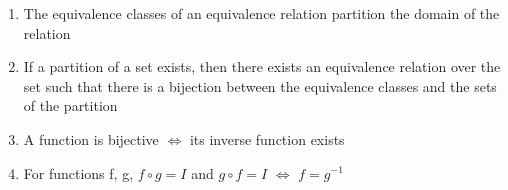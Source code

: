 \documentclass{article}
\begin{document}
\begin{enumerate}
\item The equivalence classes of an equivalence relation partition the domain of
the relation

\item If a partition of a set exists, then there exists an equivalence relation
over the set such that there is a bijection between the equivalence classes and
the sets of the partition

\item A function is bijective $\iff$ its inverse function exists

\item For functions f, g, $f \circ g = I$ and $g \circ f = I$ $\iff$ $f = g^{-1}$

\end{enumerate}
\end{document}
